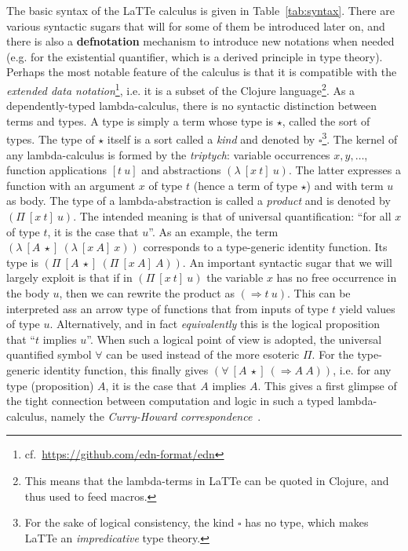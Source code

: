 \documentclass{styles/sig-alternate-05-2015}
\newcommand{\typeterm}{\star}
\newcommand{\kindterm}{\square}
\newcommand{\fimplies}{\Longrightarrow}
\newcommand{\kw}[1]{\textbf{#1}}
\begin{document}
 The basic syntax of the LaTTe calculus is given in Table~\ref{tab:syntax}. There are
 various syntactic sugars that will for some of them be introduced later on, and there
 is also a \kw{defnotation} mechanism to introduce new notations when needed (e.g. for the
 existential quantifier, which is a derived principle in type theory). Perhaps
 the most notable feature of the calculus is that it is compatible with the \emph{extended data notation}\footnote{cf.~\url{https://github.com/edn-format/edn}},
 i.e. it is a subset of the Clojure language\footnote{This means that the lambda-terms in LaTTe can be quoted in Clojure, and thus used to feed macros.}. As a dependently-typed lambda-calculus,
 there is no syntactic distinction between terms and types. A type is simply a term whose
 type is $\typeterm$, called the sort of types. The type of $\typeterm$ itself is a sort called a \emph{kind} and denoted by $\kindterm$\footnote{For the sake of logical consistency, the kind $\kindterm$ has no type, which makes LaTTe an \emph{impredicative} type theory.}.
 The kernel of any lambda-calculus is formed by the \emph{triptych}: variable occurrences $x,y,\ldots$,
 function applications $[t~u]$ and abstractions $(\lambda~[x~t]~u)$. The latter expresses a function with an argument $x$ of type
 $t$ (hence a term of type $\typeterm$) and with term $u$ as body. The type of a lambda-abstraction is called a \emph{product}
 and is denoted by $(\Pi~[x~t]~u)$. The intended meaning is that of universal quantification: ``for all $x$ of type $t$, it is the case that $u$''.
 As an example, the term $(\lambda~[A~\typeterm]~(\lambda~[x~A]~x))$ corresponds to a type-generic identity function. Its type is $(\Pi~[A~\typeterm]~(\Pi~[x~A]~A))$.
 An important syntactic sugar that we will largely exploit is that if in $(\Pi~[x~t]~u)$ the variable $x$ has no free occurrence in the body $u$, then we can rewrite the product as $(\fimplies t~u)$.
 This can be interpreted ass an arrow type of functions that from inputs of type $t$ yield values of type $u$. Alternatively, and in fact \emph{equivalently} this is the logical proposition that ``$t$ implies $u$''.
  When such a logical point of view is adopted, the universal quantified symbol $\forall$ can be used instead of the more esoteric $\Pi$.
 For the type-generic identity function, this finally gives $(\forall~[A~\typeterm]~(\fimplies A~A))$, i.e. for any type (proposition) $A$, it is the case that $A$ implies $A$.
 This gives a first glimpse of the tight connection between computation and logic in such a typed lambda-calculus, namely the \emph{Curry-Howard correspondence}~\cite{curry-howard:book}.
\end{document}
